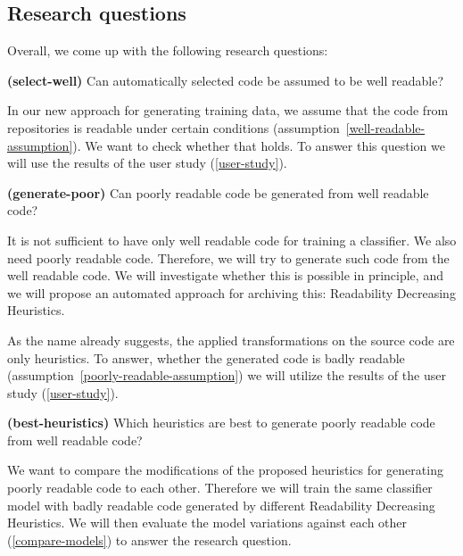 \documentclass[%
class=scrreprt,
chapterprefix=false,%
open=right,%
twoside=false,%
paper=a4,%
logofile={Logo\_zentral\_farbig\_EN.png},%
thesistype=masterproposal,%
UKenglish,%
]{se2thesis}
\begin{document}
	
	\subsection{Research questions}\label{research-questions}
	Overall, we come up with the following research questions:
	
	
	\begin{resq} \textbf{(select-well)} Can automatically selected code be assumed to be well readable?\end{resq} \label{select-well}
	In our new approach for generating training data, we assume that the code from repositories is readable under certain conditions (assumption~\ref{well-readable-assumption}). We want to check whether that holds. To answer this question we will use the results of the user study (\ref{user-study}).
	
	\begin{resq} \textbf{(generate-poor)} Can poorly readable code be generated from well readable code?\end{resq} \label{generate-poor}
	It is not sufficient to have only well readable code for training a classifier. We also need poorly readable code. Therefore, we will try to generate such code from the well readable code. We will investigate whether this is possible in principle, and we will propose an automated approach for archiving this: Readability Decreasing Heuristics.
	
	As the name already suggests, the applied transformations on the source code are only heuristics. To answer, whether the generated code is badly readable (assumption~\ref{poorly-readable-assumption}) we will utilize the results of the user study (\ref{user-study}).
	
	\begin{resq} \textbf{(best-heuristics)} Which heuristics are best to generate poorly readable code from well readable code?\end{resq} \label{best-heuristic}
	We want to compare the modifications of the proposed heuristics for generating poorly readable code to each other. Therefore we will train the same classifier model with badly readable code generated by different Readability Decreasing Heuristics. We will then evaluate the model variations against each other (\ref{compare-models}) to answer the research question.
	
\end{document}
